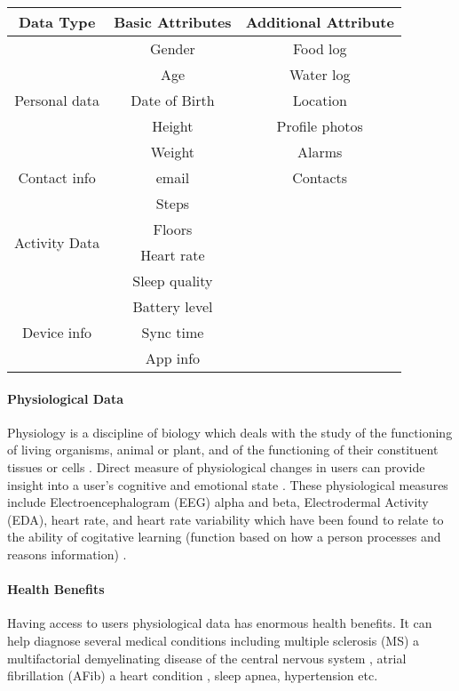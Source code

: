 \begin{center}
\begin{tabular}{ |c|c|c| }
\hline
Data Type & Basic Attributes & Additional Attribute \\
\hline
\multirow{5}{8em}{Personal data} & Gender & Food log \\ 
& Age & Water log \\ 
& Date of Birth & Location \\ 
& Height & Profile photos \\ 
& Weight & Alarms \\ 
\hline
\multirow{1}{8em}{Contact info} & email & Contacts \\
\hline
\multirow{4}{8em}{Activity Data} & Steps &  \\
& Floors & \\
& Heart rate & \\
& Sleep quality & \\
\hline
\multirow{3}{8em}{Device info} & Battery level & \\
& Sync time & \\
& App info & \\
\hline
\end{tabular}
\label{tab:data_wearable_devices}
\end{center}

 \paragraph{Physiological Data} Physiology is a discipline of biology which deals with the study of the functioning of living organisms, animal or plant, and of the functioning of their constituent tissues or cells \cite{scheer_physiology_nodate}. Direct measure of physiological changes in users can provide insight into a user's cognitive and emotional state \cite{benbasat_incorporating_nodate}. These physiological measures include Electroencephalogram (EEG) alpha and beta, Electrodermal Activity (EDA), heart rate, and heart rate variability which have been found to relate to the ability of cogitative learning (function based on how a person processes and reasons information) \cite{leger_neurophysiological_2014}.
 
\paragraph{Health Benefits} Having access to users physiological data has enormous health benefits. It can help diagnose several medical conditions including multiple sclerosis (MS) a multifactorial demyelinating disease of the central nervous system \cite{sparaco_role_2018}, atrial fibrillation (AFib) a heart condition \cite{nemati_monitoring_2016}, sleep apnea, hypertension \cite{tison_geoffrey_h_abstract_2017} etc.

